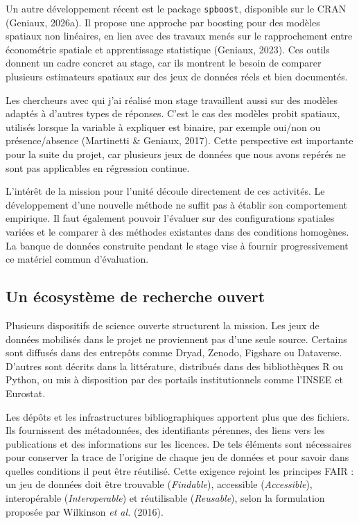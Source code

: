 \documentclass[11pt,a4paper]{article}
\begin{document}
Un autre développement récent est le package \texttt{spboost}, disponible sur le CRAN (Geniaux, 2026a). Il propose une approche par boosting pour des modèles spatiaux non linéaires, en lien avec des travaux menés sur le rapprochement entre économétrie spatiale et apprentissage statistique (Geniaux, 2023). Ces outils donnent un cadre concret au stage, car ils montrent le besoin de comparer plusieurs estimateurs spatiaux sur des jeux de données réels et bien documentés.

Les chercheurs avec qui j'ai réalisé mon stage travaillent aussi sur des modèles adaptés à d'autres types de réponses. C'est le cas des modèles probit spatiaux, utilisés lorsque la variable à expliquer est binaire, par exemple oui/non ou présence/absence (Martinetti \& Geniaux, 2017). Cette perspective est importante pour la suite du projet, car plusieurs jeux de données que nous avons repérés ne sont pas applicables en régression continue.

L'intérêt de la mission pour l'unité découle directement de ces activités. Le développement d'une nouvelle méthode ne suffit pas à établir son comportement empirique. Il faut également pouvoir l'évaluer sur des configurations spatiales variées et le comparer à des méthodes existantes dans des conditions homogènes. La banque de données construite pendant le stage vise à fournir progressivement ce matériel commun d'évaluation.

\subsection{Un écosystème de recherche ouvert}

Plusieurs dispositifs de science ouverte structurent la mission. Les jeux de données mobilisés dans le projet ne proviennent pas d'une seule source. Certains sont diffusés dans des entrepôts comme Dryad, Zenodo, Figshare ou Dataverse. D'autres sont décrits dans la littérature, distribués dans des bibliothèques R ou Python, ou mis à disposition par des portails institutionnels comme l'INSEE et Eurostat.

Les dépôts et les infrastructures bibliographiques apportent plus que des fichiers. Ils fournissent des métadonnées, des identifiants pérennes, des liens vers les publications et des informations sur les licences. De tels éléments sont nécessaires pour conserver la trace de l'origine de chaque jeu de données et pour savoir dans quelles conditions il peut être réutilisé. Cette exigence rejoint les principes FAIR : un jeu de données doit être trouvable (\textit{Findable}), accessible (\textit{Accessible}), interopérable (\textit{Interoperable}) et réutilisable (\textit{Reusable}), selon la formulation proposée par Wilkinson \textit{et al.} (2016).
\end{document}
